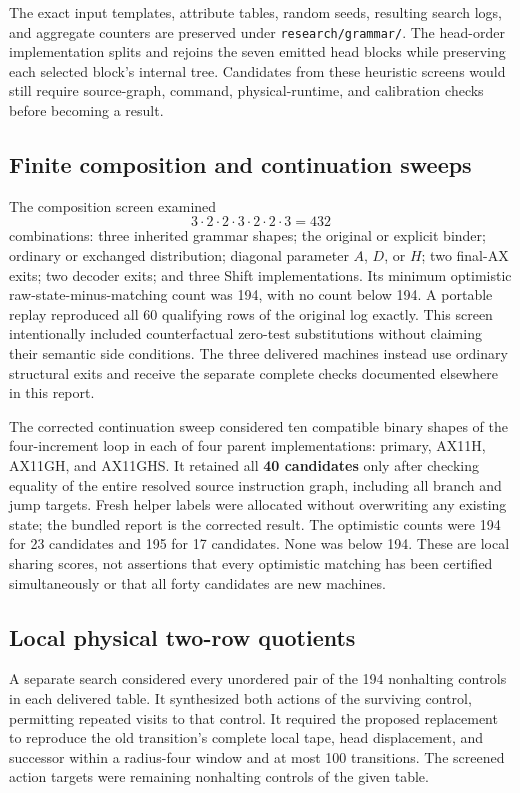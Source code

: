 The exact input templates, attribute tables, random seeds, resulting search
logs, and aggregate counters are preserved under \texttt{research/grammar/}.
The head-order implementation splits and rejoins the seven emitted head
blocks while preserving each selected block's internal tree.  Candidates
from these heuristic screens would still require source-graph, command,
physical-runtime, and calibration checks before becoming a result.

\subsection{Finite composition and continuation sweeps}

The composition screen examined
\[
 3\cdot2\cdot2\cdot3\cdot2\cdot2\cdot3=432
\]
combinations: three inherited grammar shapes; the original or explicit
binder; ordinary or exchanged distribution; diagonal parameter $A$, $D$, or
$H$; two final-AX exits; two decoder exits; and three Shift implementations.
Its minimum optimistic raw-state-minus-matching count was 194, with no count
below 194.  A portable replay reproduced all 60 qualifying rows of the
original log exactly.  This screen intentionally included counterfactual
zero-test substitutions without claiming their semantic side conditions.
The three delivered machines instead use ordinary structural exits and
receive the separate complete checks documented elsewhere in this report.

The corrected continuation sweep considered ten compatible binary shapes
of the four-increment loop in each of four parent implementations: primary,
AX11H, AX11GH, and AX11GHS.  It retained all \textbf{40 candidates} only after
checking equality of the entire resolved source instruction graph, including
all branch and jump targets.  Fresh helper labels were allocated without
overwriting any existing state; the bundled report is the corrected result.
The optimistic counts were 194 for 23 candidates and 195 for 17 candidates.
None was below 194.  These are local sharing scores, not assertions that every
optimistic matching has been certified simultaneously or that all forty
candidates are new machines.

\subsection{Local physical two-row quotients}

A separate search considered every unordered pair of the 194 nonhalting
controls in each delivered table.  It synthesized both actions of the
surviving control, permitting repeated visits to that control.  It required
the proposed replacement to reproduce the old transition's complete local
tape, head displacement, and successor within a radius-four window and at
most 100 transitions.  The screened action targets were remaining
nonhalting controls of the given table.

